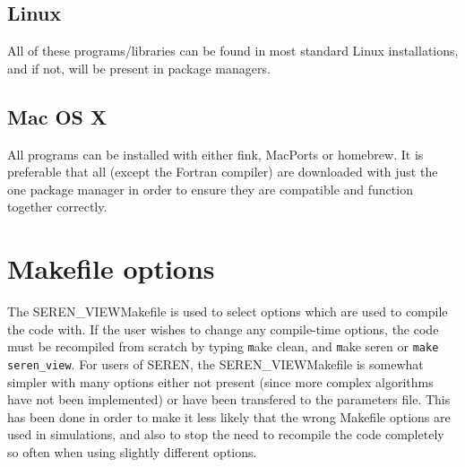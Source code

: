 \documentclass[a4paper]{article}
\newcommand{\CODENAME}{SEREN\_VIEW}
\newcommand{\var}[1]{\texttt{#1}}
\begin{document}
\subsection{Linux}
All of these programs/libraries can be found in most standard Linux installations, and if not, will be present in package managers.


\subsection{Mac OS X}
All programs can be installed with either fink, MacPorts or homebrew.  It is preferable that all (except the Fortran compiler) are downloaded with just the one package manager in order to ensure they are compatible and function together correctly.

\newpage


\section{Makefile options}
The \CODENAME Makefile is used to select options which are used to compile the code with.  If the user wishes to change any compile-time options, the code must be recompiled from scratch by typing {\var make clean}, and {\var make seren} or \var{make seren\_view}.  For users of SEREN, the \CODENAME Makefile is somewhat simpler with many options either not present (since more complex algorithms have not been implemented) or have been transfered to the parameters file.  This has been done in order to make it less likely that the wrong Makefile options are used in simulations, and also to stop the need to recompile the code completely so often when using slightly different options.
\end{document}
